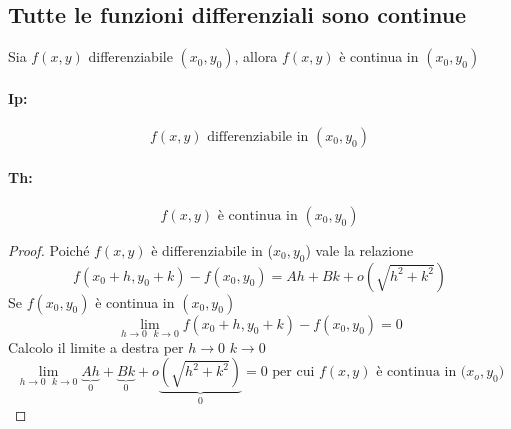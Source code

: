\subsection{Tutte le funzioni differenziali sono continue}
Sia $f(x,y)$ differenziabile $(x_0,y_0)$, allora $f(x,y)$ è continua in $(x_0,y_0)$
\begin{multicols}{2}
  \paragraph{Ip:}
  \begin{equation*}
    f(x,y) \text{ differenziabile in } (x_0,y_0)
  \end{equation*}
  \paragraph{Th:}
  \begin{equation*}
    f(x,y) \text{ è continua in } (x_0,y_0)
  \end{equation*}
\end{multicols}
\begin{proof}
  Poiché $f(x,y)$ è differenziabile in ($x_0,y_0$) vale la relazione
  \begin{equation*}
    f(x_0+h,y_0+k) - f(x_0,y_0)=Ah+Bk+o(\sqrt{h^2+k^2})
  \end{equation*}
  Se $f(x_0,y_0)$ è continua in $(x_0,y_0)$
  \begin{equation*}
    \lim_{h\to 0\text{ } k\to 0}f(x_0+h,y_0+k) - f(x_0,y_0)=0
  \end{equation*}
  Calcolo il limite a destra per $h\to 0$ $k\to 0$
  \begin{equation*}
    \lim_{h\to 0\text{ } k\to 0}\underbrace{Ah}_0+\underbrace{Bk}_0+o\underbrace{(\sqrt{h^2+k^2})}_0=0 \text{ per cui $f(x,y)$ è continua in ($x_o,y_0$)}
  \end{equation*} 
\end{proof}
